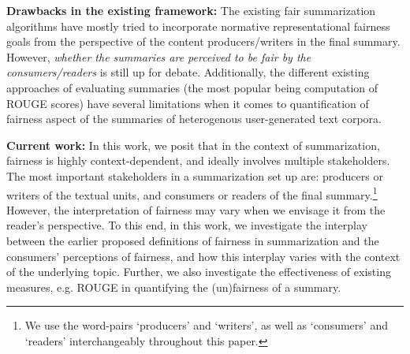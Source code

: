 \vspace{1 mm}
\noindent
\textbf{Drawbacks in the existing framework:} 
The existing fair summarization algorithms have mostly tried to incorporate normative representational fairness goals from the perspective of the content producers/writers in the final summary. 
However, {\it whether the summaries are perceived to be fair by the consumers/readers} is still up for debate. %
Additionally, the different existing approaches of evaluating summaries (the most popular being computation of ROUGE scores) have several limitations when it comes to quantification of fairness aspect of the summaries of heterogenous user-generated text corpora. 

\vspace{1 mm}
\noindent
\textbf{Current work:} In this work, we posit that in the context of summarization, fairness is highly context-dependent, and ideally involves multiple stakeholders. 
The most important stakeholders in a summarization set up are: producers or writers of the textual units, and consumers or readers of the final summary.\footnote{We use the word-pairs `producers' and `writers', as well as `consumers' and `readers' interchangeably throughout this paper.} 
However, the interpretation of fairness may vary when we envisage it from the reader's perspective. To this end, in this work, we investigate the interplay between the earlier proposed definitions of fairness in summarization and the consumers' perceptions of fairness, and how this interplay varies with the context of the underlying topic. Further, we also investigate the effectiveness of existing measures, e.g. ROUGE in quantifying the (un)fairness of a summary. 

